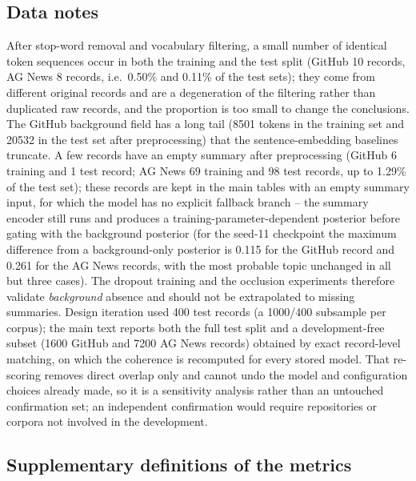 \documentclass[11pt]{article}
\begin{document}
\subsection{Data notes}

After stop-word removal and vocabulary filtering, a small number of identical token sequences occur
in both the training and the test split (GitHub 10 records, AG News 8 records, i.e.\ 0.50\% and
0.11\% of the test sets); they come from different original records and are a degeneration of the
filtering rather than duplicated raw records, and the proportion is too small to change the
conclusions. The GitHub background field has a long tail (8501 tokens in the training set and
20532 in the test set after preprocessing) that the sentence-embedding baselines truncate. A few
records have an empty summary after preprocessing (GitHub 6 training and 1 test record; AG News 69
training and 98 test records, up to 1.29\% of the test set); these records are kept in the main
tables with an empty summary input, for which the model has no explicit fallback branch -- the
summary encoder still runs and produces a training-parameter-dependent posterior before gating
with the background posterior (for the seed-11 checkpoint the maximum difference from a
background-only posterior is 0.115 for the GitHub record and 0.261 for the AG News records, with
the most probable topic unchanged in all but three cases). The dropout training and the occlusion
experiments therefore validate \emph{background} absence and should not be extrapolated to missing
summaries. Design iteration used 400 test records (a 1000/400 subsample per corpus); the main text
reports both the full test split and a development-free subset (1600 GitHub and 7200 AG News
records) obtained by exact record-level matching, on which the coherence is recomputed for every
stored model. That re-scoring removes direct overlap only and cannot undo the model and
configuration choices already made, so it is a sensitivity analysis rather than an untouched
confirmation set; an independent confirmation would require repositories or corpora not involved
in the development.

\subsection{Supplementary definitions of the metrics}
\end{document}
